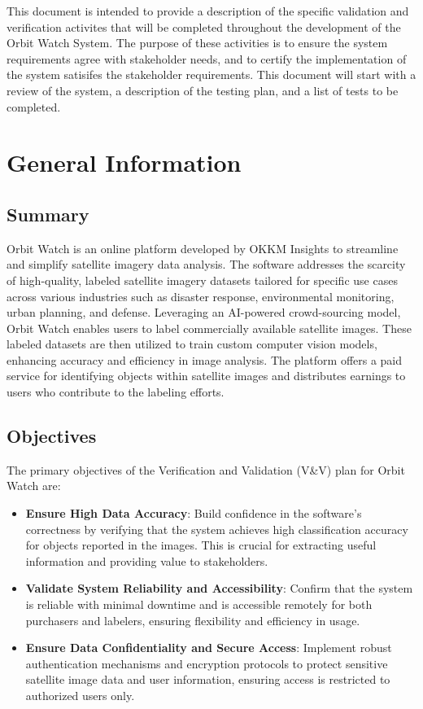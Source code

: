 \documentclass[12pt, titlepage]{article}
\begin{document}
\newpage


This document is intended to provide a description of the specific validation and verification activites that will be completed throughout the development of the Orbit Watch System.
The purpose of these activities is to ensure the system requirements agree with stakeholder needs, and to certify the implementation of the system satisifes the stakeholder requirements. This document will
start with a review of the system, a description of the testing plan, and a list of tests to be completed.


  \section{General Information}

  \subsection{Summary} \cite{Problem_Statement}
  
  Orbit Watch is an online platform developed by OKKM Insights to streamline and simplify satellite imagery data analysis. The software addresses the scarcity of high-quality, labeled satellite imagery datasets tailored for specific use cases across various industries such as disaster response, environmental monitoring, urban planning, and defense. Leveraging an AI-powered crowd-sourcing model, Orbit Watch enables users to label commercially available satellite images. These labeled datasets are then utilized to train custom computer vision models, enhancing accuracy and efficiency in image analysis. The platform offers a paid service for identifying objects within satellite images and distributes earnings to users who contribute to the labeling efforts.
  
  \subsection{Objectives} \cite{Problem_Statement}
  
  The primary objectives of the Verification and Validation (V\&V) plan for Orbit Watch are:
  
  \begin{itemize}
      \item \textbf{Ensure High Data Accuracy}: Build confidence in the software's correctness by verifying that the system achieves high classification accuracy for objects reported in the images. This is crucial for extracting useful information and providing value to stakeholders.
      \item \textbf{Validate System Reliability and Accessibility}: Confirm that the system is reliable with minimal downtime and is accessible remotely for both purchasers and labelers, ensuring flexibility and efficiency in usage.
      \item \textbf{Ensure Data Confidentiality and Secure Access}: Implement robust authentication mechanisms and encryption protocols to protect sensitive satellite image data and user information, ensuring access is restricted to authorized users only.
  \end{itemize}
  
\end{document}
